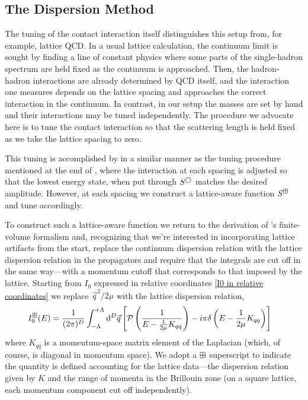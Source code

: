 \subsection{The Dispersion Method}\label{sec:dispersion}

The tuning of the contact interaction itself distinguishes this setup from, for example, lattice QCD.
In a usual lattice calculation, the continuum limit is sought by finding a line of constant physics where some parts of the single-hadron spectrum are held fixed as the continuum is approached.
Then, the hadron-hadron interactions are already determined by QCD itself, and the interaction one measures depends on the lattice spacing and approaches the correct interaction in the continuum.
In contrast, in our setup the masses are set by hand and their interactions may be tuned independently.
The procedure we advocate here is to tune the contact interaction so that the scattering length is held fixed as we take the lattice spacing to zero.

This tuning is accomplished by in a similar manner as the tuning procedure mentioned at the end of , where the interaction at each spacing is adjusted so that the lowest energy state, when put through $S^{\bigcirc}$ matches the desired amplitude.
However, at each spacing we construct a lattice-aware function $S^{\boxplus}$ and tune accordingly.

To construct such a lattice-aware function we return to the derivation of \Luscher's finite-volume formalism and, recognizing that we're interested in incorporating lattice artifacts from the start, replace the continuum dispersion relation with the lattice dispersion relation in the propagators and require that the integrals are cut off in the same way---with a momentum cutoff that corresponds to that imposed by the lattice.
Starting from $I_0$ expressed in relative coordinates \eqref{I0 in relative coordinates} we replace $\vec{q}^2/2\mu$ with the lattice dispersion relation,
\begin{align}
    \label{eq:dispersion I0}
    I_0^{\boxplus}(E)
    &=\frac{1}{(2\pi)^D}
    \int_{-\Lambda}^{+\Lambda}
        \mathrm{d}^D \vec{q}
        \left[
            \mathcal{P} \left(
                \frac{1}{
                    E - \frac{1}{2\mu} K_{qq} }
                \right)
            -i \pi \delta\left(E - \frac{1}{2\mu}K_{qq}\right)
        \right]
\end{align}
where $K_{qq}$ is a momentum-space matrix element of the Laplacian (which, of course, is diagonal in momentum space).
We adopt a $\boxplus$ superscript to indicate the quantity is defined accounting for the lattice data---the dispersion relation given by $K$ and the range of momenta in the Brillouin zone (on a square lattice, each momentum component cut off independently).

